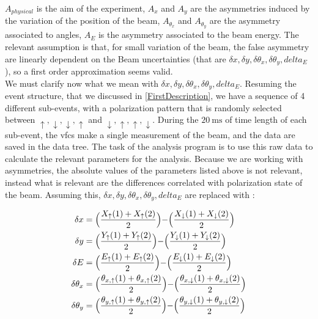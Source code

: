 $A_{physical}$ is the aim of the experiment, $A_{x}$ and $A_{y}$ are the asymmetries induced by the variation of the position of the beam, $A_{\theta_{x}}$ and $A_{\theta_{y}}$ are the asymmetry associated to angles, $A_{E}$ is the asymmetry associated to the beam energy. 
The relevant assumption is that, for small variation of the beam, the false asymmetry are linearly dependent on the Beam uncertainties (that are $\delta x, \delta y, \delta \theta_{x}, \delta \theta_{y}, delta_{E}$), so a first order approximation seems valid.\\
We must clarify now what we mean with $\delta x, \delta y, \delta \theta_{x}, \delta \theta_{y}, delta_{E}$. Resuming the event structure, that we discussed in \ref{FirstDescription}, we have a sequence of 4 different sub-events, with a polarization pattern that is randomly selected between $\uparrow,\downarrow,\downarrow, \uparrow$ and $\downarrow,\uparrow,\uparrow,\downarrow$. During the $\SI{20}{\milli \second}$ of time length of each sub-event, the vfcs make a single measurement of the beam, and the data are saved in the data tree. The task of the analysis program is to use this raw data to calculate the relevant parameters for the analysis. Because we are working with asymmetries, the absolute values of the parameters listed above is not relevant, instead what is relevant are the differences correlated with polarization state of the beam. Assuming this, $\delta x, \delta y, \delta \theta_{x}, \delta \theta_{y}, delta_{E}$ are replaced with :

\begin{equation}
\begin{split}
\delta {x} & = \Bigl(\dfrac{X_{\uparrow}(1) + X_{\uparrow}(2)}{2}\Bigl)  - \Bigl(\dfrac{X_{\downarrow}(1) + X_{\downarrow}(2)}{2}\Bigl)\\
\delta {y} & = \Bigl(\dfrac{Y_{\uparrow}(1) + Y_{\uparrow}(2)}{2}\Bigl)  - \Bigl(\dfrac{Y_{\downarrow}(1) + Y_{\downarrow}(2)}{2}\Bigl)\\
\delta {E} & = \Bigl(\dfrac{E_{\uparrow}(1) + E_{\uparrow}(2)}{2}\Bigl)  - \Bigl(\dfrac{E_{\downarrow}(1) + E_{\downarrow}(2)}{2}\Bigl)\\
\delta {\theta_{x}} & = \Bigl( \dfrac{\theta_{x,\uparrow}(1) + \theta_{x,\uparrow}(2)}{2} \Bigl) - \Bigl(\dfrac{\theta_{x,\downarrow}(1) + \theta_{x,\downarrow}(2)}{2} \Bigl)\\
\delta {\theta_{y}} & = \Bigl( \dfrac{\theta_{y,\uparrow}(1) + \theta_{y,\uparrow}(2)}{2} \Bigl) - \Bigl(\dfrac{\theta_{y,\downarrow}(1) + \theta_{y,\downarrow}(2)}{2} \Bigl)\\ 
\end{split}
\end{equation}

